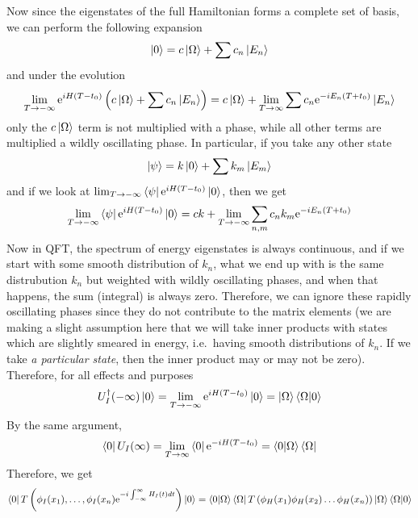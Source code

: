 \documentclass[11pt, notitlepage]{report}
\newcommand{\e}{\mathrm{e}}
\numberwithin{equation}{section}
\begin{document}
Now since the eigenstates of the full Hamiltonian forms a complete set of basis, we can perform the following expansion 
\begin{equation*}
    \ket{0} = c\ket{\Omega} + \sum c_n \ket{E_n}
\end{equation*}
and under the evolution
\begin{equation*}
    \lim_{T\to -\infty} \e^{iH(T-t_0)}\left(c\ket{\Omega} + \sum c_n \ket{E_n}\right) =c\ket{\Omega} +  \lim_{T\to \infty} \sum c_n \e^{-iE_n(T+t_0)}\ket{E_n}
\end{equation*}
only the \(c\ket{\Omega}\) term is not multiplied with a phase, while all other terms are multiplied a wildly oscillating phase. In particular, if you take any other state 
\begin{equation*}
    \ket{\psi} = k\ket{0} + \sum k_m \ket{E_m}
\end{equation*}
and if we look at \(\lim_{T\to -\infty} \bra{\psi}  \e^{iH(T-t_0)} \ket{0}\), then we get 
\begin{equation*}
    \lim_{T\to -\infty} \bra{\psi}  \e^{iH(T-t_0)} \ket{0} = ck + \lim_{T\to -\infty} \sum_{n,m}c_n k_m \e^{-iE_n(T+t_0)}
\end{equation*}
Now in QFT, the spectrum of energy eigenstates is always continuous, and if we start with some smooth distribution of \(k_n\), what we end up with is the same distrubution \(k_n\) but weighted with wildly oscillating phases, and when that happens, the sum (integral) is always zero. Therefore, we can ignore these rapidly oscillating phases since they do not contribute to the matrix elements (we are making a slight assumption here that we will take inner products with states which are slightly smeared in energy, i.e.\ having smooth distributions of \(k_n\). If we take \textit{a particular state}, then the inner product may or may not be zero). \\

Therefore, for all effects and purposes 
\begin{equation*}
    U_I^\dagger (-\infty)\ket{0} = \lim_{T\to -\infty} \e^{iH(T-t_0)}\ket{0} = \ket{\Omega} \braket{\Omega|0}
\end{equation*}
By the same argument, 
\begin{equation*}
    \bra{0} U_I(\infty) = \lim_{T\to \infty} \bra{0}\e^{-iH(T-t_0)} = \braket{0|\Omega} \bra{\Omega}
\end{equation*}
Therefore, we get 
\begin{equation*}
    \bra{0} T\left( \phi_I(x_1),\ldots,\phi_I(x_n)  \e^{-i\int_{-\infty}^{\infty}H_I(t)dt}\right) \ket{0} = \braket{0|\Omega} \bra{\Omega}T\left(  \phi_H(x_1)\phi_H(x_2)\ldots\phi_H(x_n) \right)\ket{\Omega} \braket{\Omega|0}
\end{equation*}
\end{document}
